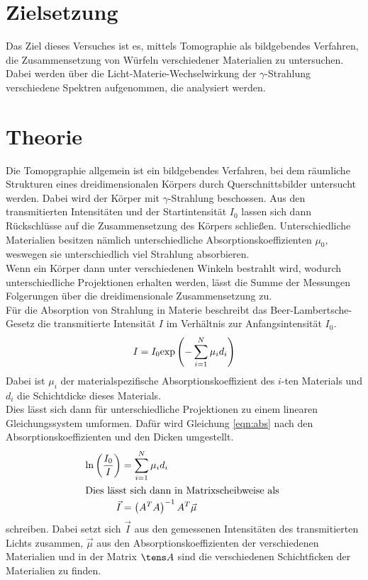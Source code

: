\section{Zielsetzung}
Das Ziel dieses Versuches ist es, mittels Tomographie als bildgebendes Verfahren, die Zusammensetzung von Würfeln verschiedener Materialien zu untersuchen.
Dabei werden über die Licht-Materie-Wechselwirkung der $\gamma$-Strahlung verschiedene Spektren aufgenommen, die analysiert werden.
	
\section{Theorie}

\noindent
Die Tomopgraphie allgemein ist ein bildgebendes Verfahren, bei dem räumliche Strukturen eines dreidimensionalen Körpers durch Querschnittsbilder untersucht werden.
Dabei wird der Körper mit $\gamma$-Strahlung beschossen. Aus den transmitierten Intensitäten und der Startintensität $I_0$ lassen sich dann Rückschlüsse auf die Zusammensetzung des Körpers schließen.
Unterschiedliche Materialien besitzen nämlich unterschiedliche Absorptionskoeffizienten $\mu_0$, weswegen sie unterschiedlich viel Strahlung absorbieren.\\
Wenn ein Körper dann unter verschiedenen Winkeln bestrahlt wird, wodurch unterschiedliche Projektionen erhalten werden, lässt die Summe der Messungen Folgerungen über die dreidimensionale Zusammensetzung zu.\\
Für die Absorption von Strahlung in Materie beschreibt das Beer-Lambertsche-Gesetz die transmitierte Intensität $I$ im Verhältnis zur Anfangsintensität $I_0$.
\begin{equation}
    I = I_0 \text{exp}\left(- \sum_{i=1}^N \mu_i d_i\right)
    \label{eqn:abs}
\end{equation}
Dabei ist $\mu_i$ der materialspezifische Absorptionskoeffizient des $i$-ten Materials und $d_i$ die Schichtdicke dieses Materials.\\
Dies lässt sich dann für unterschiedliche Projektionen zu einem linearen Gleichungssystem umformen. 
Dafür wird Gleichung \ref{eqn:abs} nach den Absorptionskoeffizienten und den Dicken umgestellt.
\begin{align}
    \ln\left(\frac{I_0}{I}\right) &= \sum_{i=1}^N \mu_i d_i \label{eqn:ln}\\
    \intertext{Dies lässt sich dann in Matrixscheibweise als }
    \vec I &=\left(A^T  A\right)^{-1} A^T \vec \mu
    \label{eqn:mu}
\end{align}
schreiben. Dabei setzt sich $\vec I$ aus den gemessenen Intensitäten des transmitierten Lichts zusammen, $\vec \mu$ aus den Absorptionskoeffizienten der verschiedenen Materialien
und in der Matrix $\tens A$ sind die verschiedenen Schichtficken der Materialien zu finden.\\

